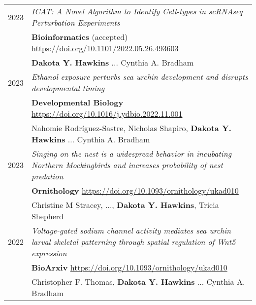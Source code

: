 \documentclass[a4paper,10pt]{article}
\begin{document}
\section{\color{linkcolour}{Publications}}
\begin{tabular}{rp{10cm}}
	\textsc{2023} & \emph{ICAT: A Novel Algorithm to Identify Cell-types in scRNAseq Perturbation Experiments}\\
	              & \small \textbf{Bioinformatics} (accepted) \href{https://doi.org/10.1101/2022.05.26.493603}{https://doi.org/10.1101/2022.05.26.493603}                                                                                   \\
	              & \footnotesize \textbf{Dakota Y. Hawkins} ... Cynthia A. Bradham                                                                                 \\
	\textsc{2023} & \emph{Ethanol exposure perturbs sea urchin development and disrupts developmental timing}\\
	              & \small \textbf{Developmental Biology} \href{https://doi.org/10.1016/j.ydbio.2022.11.001}{https://doi.org/10.1016/j.ydbio.2022.11.001}                                                                        \\
	              & \footnotesize Nahomie Rodríguez-Sastre, Nicholas Shapiro, \textbf{Dakota Y. Hawkins} ... Cynthia A. Bradham                                     \\
	\textsc{2023} & \emph{Singing on the nest is a widespread behavior in incubating Northern Mockingbirds and increases probability of nest predation}\\
	              & \small \textbf{Ornithology}  \href{https://doi.org/10.1093/ornithology/ukad010}{https://doi.org/10.1093/ornithology/ukad010}                                                                      \\
	              & \footnotesize  Christine M Stracey, ..., \textbf{Dakota Y. Hawkins}, Tricia Shepherd  \\ 		  
	\textsc{2022} & \emph{Voltage-gated sodium channel activity mediates sea urchin larval skeletal patterning through spatial regulation of Wnt5 expression}\\
	              & \small \textbf{BioArxiv} \href{https://doi.org/10.1101/2022.11.18.517086}{https://doi.org/10.1093/ornithology/ukad010}                                                                                       \\
	              & \footnotesize Christopher F. Thomas, \textbf{Dakota Y. Hawkins} ... Cynthia A. Bradham                                                          \\
\end{tabular}
\end{document}
